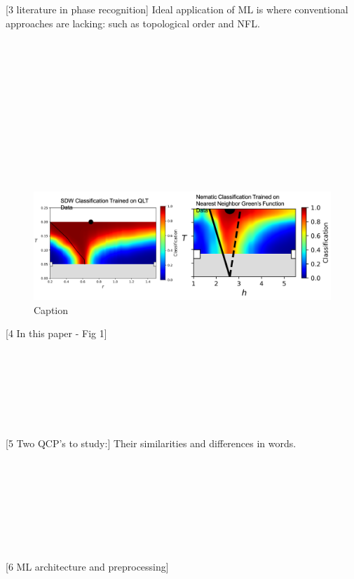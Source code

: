 \documentclass[amsmath,amssymb, aps, prx, longbibliography, twocolumn]{revtex4-1}
\begin{document}
[3 literature in phase recognition]
Ideal application of ML is where conventional approaches are lacking: such as topological order and NFL.
 \\
 \\
 \\
 \\
 \\
 \\
 \\
 \\
 \\
 \\
 \\
 \\
 \begin{figure} [t]
    \centering
\includegraphics[width=.5\textwidth]{3PT-PDs.png}
    \caption{Caption}
    \label{fig:my_label}
\end{figure}
[4 In this paper - Fig 1] 
\\
\\
\\
\\
\\
\\
\\
\\


[5 Two QCP's to study:]
Their similarities and differences in words.
\\
\\
\\
\\
\\
\\
\\
\\
\\

[6 ML architecture and preprocessing]
\\
\\
\\
\\
\\
\\
\\
\\
\\
\\
\\
\end{document}
